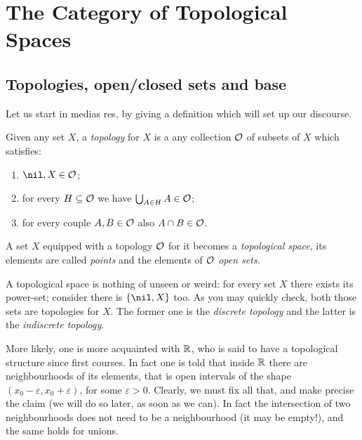 
\section{The Category of Topological Spaces}

\subsection{Topologies, open/closed sets and base}

Let us start in medias res, by giving a definition which will set up our discourse.

\begin{definition}\label{definition:DefTop}
Given any set \(X\), a {\em topology} for \(X\) is a any collection \(\mathcal O\) of subsets of \(X\) which satisfies:
\begin{enumerate}
\item \(\nil, X \in \calO\);
\item for every \(H \subseteq \mathcal O\) we have \(\bigcup_{A \in H} A \in \mathcal O\);
\item for every couple \(A, B \in \mathcal O\) also \(A \cap B \in \mathcal O\).
\end{enumerate}
A set \(X\) equipped with a topology \(\mathcal O\) for it becomes a {\em topological space}, its elements are called {\em points} and the elements of \(\mathcal O\) {\em open sets}. 
\end{definition}

A topological space is nothing of unseen or weird: for every set \(X\) there exists its power-set; consider there is \(\set{\nil, X}\) too. As you may quickly check, both those sets are topologies for \(X\). The former one is the {\em discrete topology} and the latter is the {\em indiscrete topology}.

\begin{example}
More likely, one is more acquainted with \(\mathbb R\), who is said to have a topological structure since first courses. In fact one is told that inside \(\mathbb R\) there are neighbourhoods of its elements, that is open intervals of the shape \((x_0-\varepsilon, x_0+\varepsilon)\), for some \(\varepsilon >0\). Clearly, we must fix all that, and make precise the claim  (we will do so later, as soon as we can). In fact the intersection of two neighbourhoods does not need to be a neighbourhood (it may be empty!), and the same holds for unions.
\end{example}


